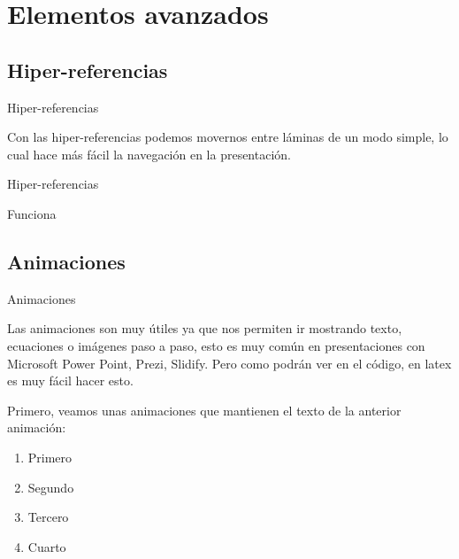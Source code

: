 \documentclass[a4paper,10pt]{beamer}
\begin{document}
\section{Elementos avanzados}
\subsection{Hiper-referencias}

\begin{frame}[label=milink1]{Hiper-referencias}
 
 Con las hiper-referencias podemos movernos entre l\'aminas
 de un modo simple, lo cual hace m\'as f\'acil la 
 navegaci\'on en la presentaci\'on.
 
 \vspace{0.4cm}
 
 \hyperlink{milink2}{}
\end{frame}

\begin{frame}[label=milink2]{Hiper-referencias}
 
 Funciona \Smiley{}
 
  \vspace{0.4cm}
 
 \hyperlink{milink1}{}
\end{frame}

\subsection{Animaciones}
\begin{frame}{Animaciones}
 
 Las animaciones son muy \'utiles ya que nos permiten
 ir mostrando texto, ecuaciones o im\'agenes paso a paso,
 esto es muy com\'un en presentaciones con Microsoft Power Point,
 Prezi, Slidify. Pero como podr\'an ver en el c\'odigo, en latex
 es muy f\'acil hacer esto.
 
 \vspace{.3cm}
 
 Primero, veamos unas animaciones que mantienen el texto de
 la anterior animaci\'on:
 

 \begin{enumerate} [<+->]
  \item Primero
  \item Segundo
  \item Tercero
  \item Cuarto
 \end{enumerate}
 
\end{frame}
\end{document}
